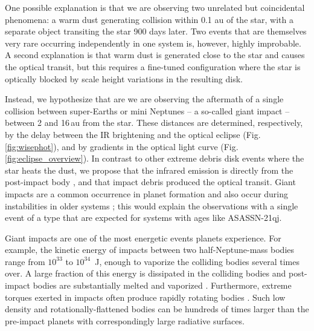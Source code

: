 \documentclass[sn-nature]{sn-jnl}%
\newcommand{\asas}{ASASSN-21qj}
\begin{document}

One possible explanation is that we are observing two unrelated but coincidental phenomena: a warm dust generating collision within 0.1 au of the star, with a separate object transiting the star 900 days later.
%
Two events that are themselves very rare occurring independently in one system is, however, highly improbable.
%
A second explanation is that warm dust is generated close to the star and causes the optical transit, but this requires a fine-tuned configuration where the star is optically blocked by scale height variations in the resulting disk.

Instead, we hypothesize that are we are observing the aftermath of a single collision between super-Earths or mini Neptunes -- a so-called giant impact -- between 2 and 16\,au from the star. 
%
These distances are determined, respectively, by the delay between the IR brightening and the optical eclipse (Fig. \ref{fig:wisephot}), and by gradients in the optical light curve (Fig. \ref{fig:eclipse_overview}).
%
In contrast to other extreme debris disk events where the star heats the dust, we propose that the infrared emission is directly from the post-impact body \cite{Lock2017,2009ApJ...704..770M}, and that impact debris produced the optical transit.
%
Giant impacts are a common occurrence in planet formation \cite{Schlichting2018a,DAngelo2018} and also occur during instabilities in older systems \cite{Kaib2016}; this would explain the observations with a single event of a type that are expected for systems with ages like \asas{}.

Giant impacts are one of the most energetic events planets experience.
%
For example, the kinetic energy of impacts between two half-Neptune-mass bodies range from $10^{33}$ to $10^{34}$~J, enough to vaporize the colliding bodies several times over.
%
A large fraction of this energy is dissipated in the colliding bodies and post-impact bodies are substantially melted and vaporized \cite{Nakajima2015,Lock2017,Carter2020}.
%
Furthermore, extreme torques exerted in impacts often produce rapidly rotating bodies \cite{Lock2017}.
%
Such low density and rotationally-flattened bodies can be hundreds of times larger than the pre-impact planets \cite{Lock2017} with correspondingly large radiative surfaces.
\end{document}
